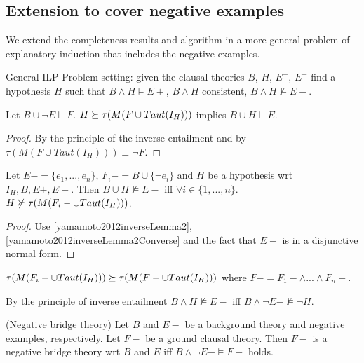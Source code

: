 \subsection{Extension to cover negative examples}
We extend the completeness results and algorithm in a more general problem of explanatory induction that includes the negative examples.
\begin{defn}General ILP Problem setting: given the clausal theories $B$, $H$, $E^+$, $E^-$ find a hypothesis $H$ such that $B \wedge H \models E+$, $B \wedge H$ consistent, $B \wedge H \not\models E-$.
\end{defn}

\begin{lemma}\label{yamamoto2012inverseLemma2Converse}
Let $B \cup \neg E \models F$. $H \succeq \tau(M(F \cup Taut(I_H)))$ implies
$B \cup H \models E$.
\end{lemma}
\begin{proof}
By the principle of the inverse entailment and by $\tau(M(F \cup Taut(I_H))) \equiv \neg F$.
\end{proof}

\begin{lemma}
Let $E-=\{e_1,...,e_n\}$, $F_i-=B \cup \{\neg e_i\}$ and $H$ be
a hypothesis wrt $I_H, B, E+, E-$.
Then $B \cup H \not\models E-$ iff
$\forall i \in \{1,...,n\}.$ $H \not\succeq \tau(M(F_i- \cup Taut(I_H)))$.
\end{lemma}

\begin{proof}
Use \ref{yamamoto2012inverseLemma2}, \ref{yamamoto2012inverseLemma2Converse} and the fact that $E-$ is in a disjunctive normal form.
\end{proof}

\begin{conjecture}
$\tau(M(F_i- \cup Taut(I_H))) \succeq \tau(M(F- \cup Taut(I_H)))$
where $F-=F_1- \wedge ... \wedge F_n-$.
\end{conjecture}

By the principle of inverse entailment
$B \wedge H \not\models E-$ iff
$B \wedge \neg E- \not\models \neg H$.

\begin{defn}
(Negative bridge theory) Let $B$ and $E-$ be a background theory and negative examples, respectively. Let $F-$ be a ground clausal theory. Then $F-$ is a negative bridge theory wrt $B$ and $E$ iff $B \wedge \neg E- \models F-$ holds.
\end{defn}

